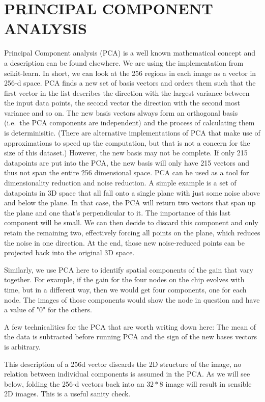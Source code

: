 \documentclass[]{spie}  %
\begin{document}
\section{PRINCIPAL COMPONENT ANALYSIS}
Principal Component analysis (PCA) is a well known mathematical concept and a description can be found elsewhere. We are using the implementation from scikit-learn\cite{scikit-learn}. In short, we can look at the 256 regions in each image as a vector in 256-d space. PCA finds a new set of basis vectors and orders them such that the first vector in the list describes the direction with the largest variance between the input data points, the second vector the direction with the second most variance and so on. The new basis vectors always form an orthogonal basis (i.e.\ the PCA components are independent) and the process of calculating them is determinisitic. (There are alternative implementations of PCA that make use of approximations to speed up the computation, but that is not a concern for the size of this dataset.) However, the new basis may not be complete. If only 215 datapoints are put into the PCA, the new basis will only have 215 vectors and thus not span the entire 256 dimensional space. PCA can be used as a tool for dimensionality reduction and noise reduction. A simple example is a set of datapoints in 3D space that all fall onto a single plane with just some noise above and below the plane. In that case, the PCA will return two vectors that span up the plane and one that's perpendicular to it. The importance of this last component will be small. We can then decide to discard this component and only retain the remaining two, effectively forcing all points on the plane, which reduces the noise in one direction. At the end, those new noise-reduced points can be projected back into the original 3D space.

Similarly, we use PCA here to identify spatial components of the gain that vary together. For example, if the gain for the four nodes on the chip evolves with time, but in a different way, then we would get four components, one for each node. The images of those components would show the node in question and have a value of "0" for the others.

A few technicalities for the PCA that are worth writing down here: The mean of the data is subtracted before running PCA and the sign of the new bases vectors is arbitrary.

This description of a 256d vector discards the 2D structure of the image, no relation between individual components is assumed in the PCA. As we will see below, folding the 256-d vectors back into an $32 * 8$ image will result in sensible 2D images. This is a useful sanity check.
\end{document}

